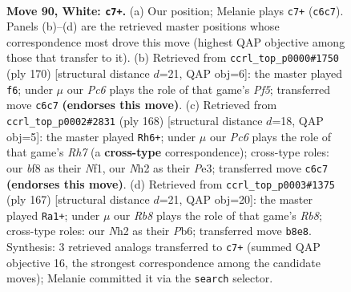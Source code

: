 \documentclass[11pt]{article}
\begin{document}
\clearpage

\begin{figure}[p]\centering
\begin{subfigure}{0.46\textwidth}\centering
\resizebox{\linewidth}{!}{%
\newchessgame
\chessboard[
  setfen={1R3b2/5r2/R1P3k1/8/7K/8/7N/8 w - - 19 90},
  showmover=false,
  pgfstyle=straightmove, color=movearrow, markmove={c6-c7}
]}
\caption{}
\end{subfigure}\hfill
\begin{subfigure}{0.46\textwidth}\centering
\resizebox{\linewidth}{!}{%
\newchessgame
\chessboard[
  setfen={8/8/8/4RP2/4b1r1/3k4/8/2K5 w - - 2 86},
  showmover=false,
  pgfstyle=straightmove, color=movearrow, markmove={f5-f6}
]}
\caption{}
\end{subfigure}
\\[4pt]
\begin{subfigure}{0.46\textwidth}\centering
\resizebox{\linewidth}{!}{%
\newchessgame
\chessboard[
  setfen={8/7R/3bk3/8/4p3/4P2K/5r2/5N2 w - - 2 85},
  showmover=false,
  pgfstyle=straightmove, color=movearrow, markmove={h7-h6}
]}
\caption{}
\end{subfigure}\hfill
\begin{subfigure}{0.46\textwidth}\centering
\resizebox{\linewidth}{!}{%
\newchessgame
\chessboard[
  setfen={2k5/8/1p6/1B1R4/K7/8/8/1r6 b - - 3 84},
  showmover=false,
  pgfstyle=straightmove, color=movearrow, markmove={b1-a1}
]}
\caption{}
\end{subfigure}
\caption{\textbf{Move 90, White: \texttt{c7+}.} (a) Our position; Melanie plays \texttt{c7+} (\texttt{c6c7}). Panels (b)--(d) are the retrieved master positions whose correspondence most drove this move (highest QAP objective among those that transfer to it). (b) Retrieved from \texttt{ccrl\_top\_p0000\#1750} (ply 170) [structural distance $d$=21, QAP obj=6]: the master played \texttt{f6}; under $\mu$ our \emph{Pc6} plays the role of that game's \emph{Pf5}; transferred move \texttt{c6c7} \textbf{(endorses this move)}. (c) Retrieved from \texttt{ccrl\_top\_p0002\#2831} (ply 168) [structural distance $d$=18, QAP obj=5]: the master played \texttt{Rh6+}; under $\mu$ our \emph{Pc6} plays the role of that game's \emph{Rh7} (a \textbf{cross-type} correspondence); cross-type roles: our \emph{b}f8 as their \emph{N}f1, our \emph{N}h2 as their \emph{P}e3; transferred move \texttt{c6c7} \textbf{(endorses this move)}. (d) Retrieved from \texttt{ccrl\_top\_p0003\#1375} (ply 167) [structural distance $d$=21, QAP obj=20]: the master played \texttt{Ra1+}; under $\mu$ our \emph{Rb8} plays the role of that game's \emph{Rb8}; cross-type roles: our \emph{N}h2 as their \emph{P}b6; transferred move \texttt{b8e8}. Synthesis: 3 retrieved analogs transferred to \texttt{c7+} (summed QAP objective 16, the strongest correspondence among the candidate moves); Melanie committed it via the \texttt{search} selector.}
\label{fig:thought-m178}
\end{figure}
\end{document}
